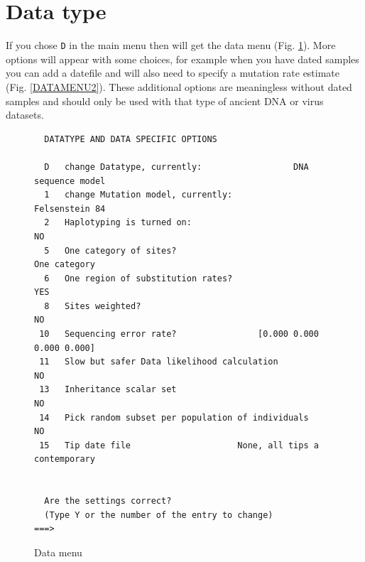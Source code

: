  \section{Data type}
If you chose {\tt D} in the main menu then will get the data menu (Fig. \ref{DATAMENU}). More options will appear with some choices, for example when you have dated samples you can add a datefile and will also need to specify a mutation rate estimate  (Fig. \ref{DATAMENU2}). These additional options are meaningless without dated samples and should only be used with that type of ancient 
DNA or virus datasets.
\begin{figure}[bht]

\begin{center}
\begin{boxedminipage}[t]{14.5cm}
\begin{small}
\begin{tt}
\begin{verbatim}
  DATATYPE AND DATA SPECIFIC OPTIONS

  D   change Datatype, currently:                  DNA sequence model
  1   change Mutation model, currently:                Felsenstein 84
  2   Haplotyping is turned on:                                    NO
  5   One category of sites?                             One category
  6   One region of substitution rates?                           YES
  8   Sites weighted?                                              NO
 10   Sequencing error rate?                [0.000 0.000 0.000 0.000]
 11   Slow but safer Data likelihood calculation                   NO
 13   Inheritance scalar set                                       NO
 14   Pick random subset per population of individuals             NO
 15   Tip date file                     None, all tips a contemporary


  Are the settings correct?
  (Type Y or the number of the entry to change)
===> 
\end{verbatim}
\end{tt}
\end{small}
\end{boxedminipage}
\end{center}
\caption{{\sf Data menu}}
\label{DATAMENU}
\end{figure}

